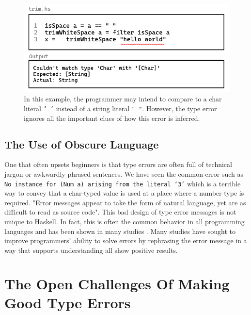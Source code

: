 \begin{figure}[hbt]
  \includegraphics[width=\linewidth]{TypeErrorExample3}
  \caption{
    \label{fig:type-error-example-3}
  In this example, the programmer may intend to compare to a char literal \texttt{' '} instead of a string literal \texttt{" "}. However, the type error ignores all the important clues of how this error is inferred. 
    }
\end{figure}


\subsection{The Use of Obscure Language}

One that often upsets beginners is that type errors are often full of technical jargon or awkwardly phrased sentences. We have seen the common error such as \texttt{No instance for (Num a) arising from the literal `3'} which is a terrible way to convey that a char-typed value is used at a place where a number type is required. "Error messages appear to take the form of natural language, yet are as difficult to read as source code". This bad design of type error messages is not unique to Haskell. In fact, this is often the common behavior in all programming languages and has been shown in many studies \cite{Barik2017-gy, Tirronen2015-nr, Prather2017-dg}. Many studies have sought to improve programmers' ability to solve errors by rephrasing the error message in a way that supports understanding \cite{Becker2016-kc, Barik2014-ib} all show positive results.


\section{The Open Challenges Of Making Good Type Errors}

